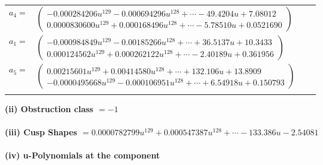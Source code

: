 \documentclass[1p]{elsarticle_modified}
\theoremstyle{definition}
\begin{document}
\begin{tabular}{m{7pt} m{180pt} m{7pt} m{180pt} }
\flushright $a_{4}=$&$\begin{pmatrix}-0.000284206 u^{129}-0.000694296 u^{128}+\cdots-49.4204 u+7.08012\\0.0000830600 u^{129}+0.000168496 u^{128}+\cdots-5.78510 u+0.0521690\end{pmatrix}$ \\
\flushright $a_{1}=$&$\begin{pmatrix}-0.000984849 u^{129}-0.00185266 u^{128}+\cdots+36.5137 u+10.3433\\0.000124562 u^{129}+0.000262122 u^{128}+\cdots-2.40189 u+0.361956\end{pmatrix}$ \\
\flushright $a_{5}=$&$\begin{pmatrix}0.00215601 u^{129}+0.00414580 u^{128}+\cdots+132.106 u+13.8909\\-0.0000495668 u^{129}-0.000106951 u^{128}+\cdots+6.54918 u+0.150793\end{pmatrix}$\\&\end{tabular}
\flushleft \textbf{(ii) Obstruction class $= -1$}\\~\\
\flushleft \textbf{(iii) Cusp Shapes $= 0.0000782799 u^{129}+0.000547387 u^{128}+\cdots-133.386 u-2.54081$}\\~\\
\newpage\renewcommand{\arraystretch}{1}
\flushleft \textbf{(iv) u-Polynomials at the component}\newline \\
\end{document}
